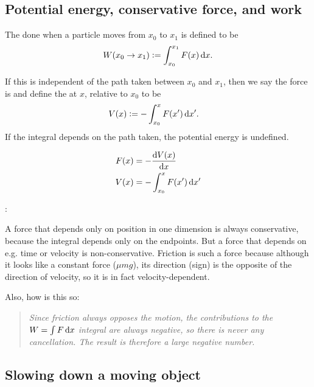 \subsection{Potential energy, conservative force, and work}

The  done when a particle moves from $x_0$ to $x_1$ is defined to be
\begin{align*}
  W(x_0 \to x_1) := \int_{x_0}^{x_1} F(x) \dx.
\end{align*}

If this is independent of the path taken between $x_0$ and $x_1$, then we say the force is
 and define the  at $x$, relative to $x_0$ to be
\begin{align*}
  V(x) &:= -\int_{x_0}^x F(x') \dx'.
\end{align*}
If the integral depends on the path taken, the potential energy is undefined.


\begin{align*}
  F(x) &= -\frac{\d V(x)}{\dx} \\
  V(x) &= -\int_{x_0}^x F(x') \dx'
\end{align*}

:

A force that depends only on position in one dimension is always conservative, because the integral
depends only on the endpoints. But a force that depends on e.g. time or velocity is
non-conservative. Friction is such a force because although it looks like a constant force
($\mu mg$), its direction (sign) is the opposite of the direction of velocity, so it is in fact
velocity-dependent.

Also, how is this so:
\begin{quote}
  \emph{Since friction always opposes the motion, the contributions to the $W = \int F \dx$ integral are
    always negative, so there is never any cancellation. The result is therefore a large negative
    number.}
\end{quote}

\subsection{Slowing down a moving object}

